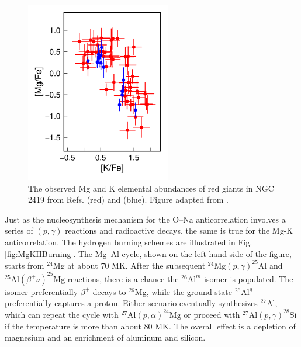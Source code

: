 \begin{figure}[t]
\centering
\includegraphics[width=2.5in]{Chapter-6/figs/MgK_Observation.png}
\caption{\label{fig:MgK}The observed Mg and K elemental abundances of red giants in NGC 2419 from Refs. \cite{Mucciarelli2012} (red) and \cite{Cohen2012} (blue). Figure adapted from \cite{Iliadis2016}.}
\end{figure}


Just as the nucleosynthesis mechanism for the O--Na anticorrelation involves a series of $(p,\gamma)$ reactions and radioactive decays, the same is true for the Mg-K anticorrelation. The hydrogen burning schemes are illustrated in Fig. \ref{fig:MgKHBurning}. The Mg--Al cycle, shown on the left-hand side of the figure, starts from $^{24}$Mg at about 70 MK. After the subsequent $^{24}\mathrm{Mg}(p,\gamma)^{25}\mathrm{Al}$ and $^{25}\mathrm{Al}(\beta^{+}\nu)^{25}\mathrm{Mg}$ reactions, there is a chance the $^{26}\mathrm{Al}^{m}$ isomer is populated. The isomer preferentially $\beta^{+}$ decays to $^{26}$Mg, while the ground state $^{26}\mathrm{Al}^{g}$ preferentially captures a proton. Either scenario eventually synthesizes $^{27}$Al, which can repeat the cycle with $^{27}\mathrm{Al}(p,\alpha)^{24}\mathrm{Mg}$ or proceed with $^{27}\mathrm{Al}(p,\gamma)^{28}\mathrm{Si}$ if the temperature is more than about 80 MK. The overall effect is a depletion of magnesium and an enrichment of aluminum and silicon.

